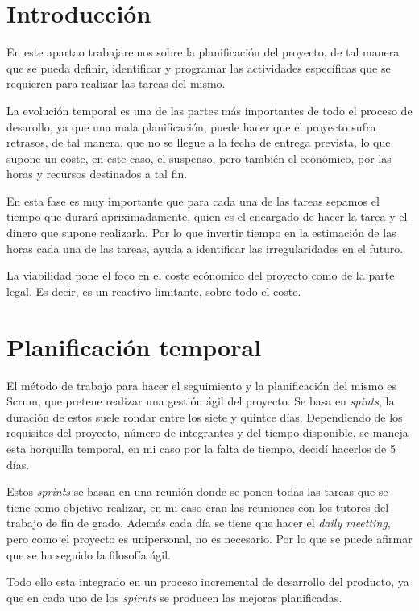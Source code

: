 
\section{Introducción}
En este apartao trabajaremos sobre la planificación del proyecto, de tal manera que se pueda definir, identificar y programar las actividades específicas que se requieren para realizar las tareas del mismo. 

La evolución temporal es una de las partes más importantes de todo el proceso de desarollo, ya que una mala planificación, puede hacer que el proyecto sufra retrasos, de tal manera, que no se llegue a la fecha de entrega prevista, lo que supone un coste, en este caso, el suspenso, pero también el económico, por las horas y recursos destinados a tal fin.

 En esta fase es muy importante que para cada una de las tareas sepamos el tiempo que durará apriximadamente, quien es el encargado de hacer la tarea y el dinero que supone realizarla. Por lo que invertir tiempo en la estimación de las horas cada una de las tareas, ayuda a identificar las irregularidades en el futuro.

La viabilidad pone el foco en el coste ecónomico del proyecto como de la parte legal. Es decir, es un reactivo limitante, sobre todo el coste.

\section{Planificación temporal}
El método de trabajo para hacer el seguimiento y la planificación del mismo es Scrum, que pretene realizar una gestión ágil del proyecto. Se basa en \emph{spints}, la duración de estos suele rondar entre los siete y quintce días. Dependiendo de los requisitos del proyecto, número de integrantes y del tiempo disponible, se maneja esta horquilla temporal, en mi caso por la falta de tiempo, decidí hacerlos de 5 días. 

Estos \emph{sprints} se basan en una reunión donde se ponen todas las tareas que se tiene como objetivo realizar, en mi caso eran las reuniones con los tutores del trabajo de fin de grado. Además cada día se tiene que hacer el \emph{daily meetting}, pero como el proyecto es unipersonal, no es necesario. Por lo que se puede afirmar que se ha seguido la filosofía ágil.

Todo ello esta integrado en un proceso incremental de desarrollo del producto, ya que en cada uno de los \emph{spirnts} se producen las mejoras planificadas.

